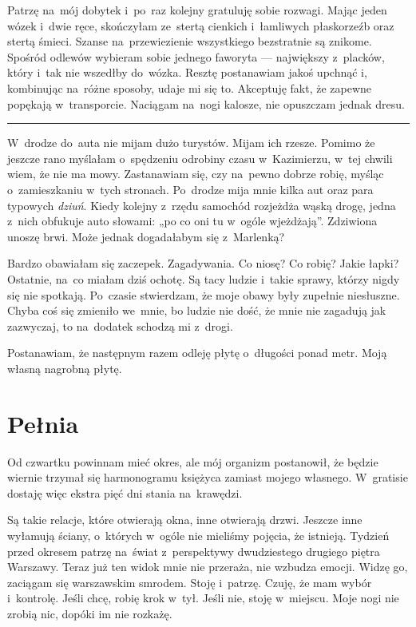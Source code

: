 \documentclass[9pt, a5paper]{memoir}
\begin{document}
Patrzę na~mój dobytek i~po~raz kolejny gratuluję sobie rozwagi. Mając jeden wózek i~dwie ręce, skończyłam ze~stertą cienkich i~łamliwych płaskorzeźb oraz stertą śmieci. Szanse na~przewiezienie wszystkiego bezstratnie są znikome. Spośród odlewów wybieram sobie jednego faworyta --- największy z~placków, który i~tak nie wszedłby do~wózka. Resztę postanawiam jakoś upchnąć i, kombinując na~różne sposoby, udaje mi się to. Akceptuję fakt, że zapewne popękają w~transporcie. Naciągam na~nogi kalosze, nie opuszczam jednak dresu.


\fancybreak{* \quad * \quad *}

W~drodze do~auta nie mijam dużo turystów. Mijam ich rzesze. Pomimo że jeszcze rano myślałam o~spędzeniu odrobiny czasu w~Kazimierzu, w~tej chwili wiem, że nie ma mowy. Zastanawiam się, czy na~pewno dobrze robię, myśląc o~zamieszkaniu w~tych stronach. Po~drodze mija mnie kilka aut oraz para typowych \textit{dziuń}. Kiedy kolejny z~rzędu samochód rozjeżdża wąską drogę, jedna z~nich obfukuje auto słowami: „po co oni tu w~ogóle wjeżdżają”. Zdziwiona unoszę brwi. Może jednak dogadałabym się z~Marlenką?

Bardzo obawiałam się zaczepek. Zagadywania. Co niosę? Co robię? Jakie łapki? Ostatnie, na~co miałam dziś ochotę. Są tacy ludzie i~takie sprawy, którzy nigdy się nie spotkają. Po~czasie stwierdzam, że moje obawy były zupełnie niesłuszne. Chyba coś się zmieniło we~mnie, bo ludzie nie dość, że mnie nie zagadują jak zazwyczaj, to na~dodatek schodzą mi z~drogi.

Postanawiam, że następnym razem odleję płytę o~długości ponad metr. Moją własną nagrobną płytę.

\newpage
\section{Pełnia}
Od czwartku powinnam mieć okres, ale mój organizm postanowił, że będzie wiernie trzymał się harmonogramu księżyca zamiast mojego własnego. W~gratisie dostaję więc ekstra pięć dni stania na~krawędzi.

Są takie relacje, które otwierają okna, inne otwierają drzwi. Jeszcze inne wyłamują ściany, o~których w~ogóle nie mieliśmy pojęcia, że istnieją. Tydzień przed okresem patrzę na~świat z~perspektywy dwudziestego drugiego piętra Warszawy. Teraz już ten widok mnie nie przeraża, nie wzbudza emocji. Widzę go, zaciągam się warszawskim smrodem. Stoję i~patrzę. Czuję, że mam wybór i~kontrolę. Jeśli chcę, robię krok w~tył. Jeśli nie, stoję w~miejscu. Moje nogi nie zrobią nic, dopóki im nie rozkażę.
\end{document}
